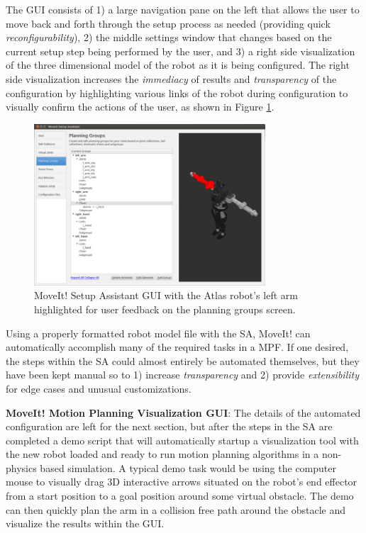 \documentclass[10pt,journal,compsoc]{joser1}
\begin{document}
{The GUI consists of 1) a large navigation pane on the left that allows the user to move back and forth through the setup process as needed (providing quick \textit{reconfigurability}), 2) the middle settings window that changes based on the current setup step being performed by the user, and 3) a right side visualization of the three dimensional model of the robot as it is being configured. The right side visualization increases the \textit{immediacy} of results and \textit{transparency} of the configuration by highlighting various links of the robot during configuration to visually confirm the actions of the user, as shown in Figure \ref{fig:setupassistant3}.

\begin{figure}[!t]
\centering
\includegraphics[width=3.4in]{images/setup_assistant3}
\caption{MoveIt! Setup Assistant GUI with the Atlas robot's left arm highlighted for user feedback on the planning groups screen.}
\label{fig:setupassistant3}	
\end{figure}

Using a properly formatted robot model file with the SA, MoveIt! can automatically accomplish many of the required tasks in a MPF. If one desired, the steps within the SA could almost entirely be automated themselves, but they have been kept manual so to 1) increase \textit{transparency} and 2) provide \textit{extensibility} for edge cases and unusual customizations.

{\bf MoveIt! Motion Planning Visualization GUI}: The details of the automated configuration are left for the next section, but after the steps in the SA are completed a demo script that will automatically startup a visualization tool with the new robot loaded and ready to run motion planning algorithms in a non-physics based simulation. A typical demo task would be using the computer mouse to visually drag 3D interactive arrows situated on the robot's end effector from a start position to a goal position around some virtual obstacle. The demo can then quickly plan the arm in a collision free path around the obstacle and visualize the results within the GUI. 

}
\end{document}
